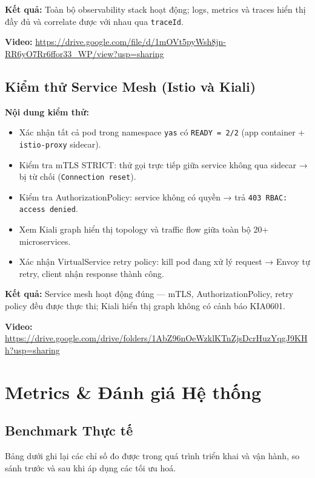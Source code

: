 \textbf{Kết quả:} Toàn bộ observability stack hoạt động; logs, metrics và traces hiển thị đầy đủ và correlate được với nhau qua \texttt{traceId}.

\noindent\textbf{Video:} \url{https://drive.google.com/file/d/1mOVt5pyWsh8jn-RR6yO7Rr6ffor33_WP/view?usp=sharing}

\subsection{Kiểm thử Service Mesh (Istio và Kiali)}

\textbf{Nội dung kiểm thử:}
\begin{itemize}
    \item Xác nhận tất cả pod trong namespace \texttt{yas} có \texttt{READY = 2/2} (app container + \texttt{istio-proxy} sidecar).
    \item Kiểm tra mTLS STRICT: thử gọi trực tiếp giữa service không qua sidecar → bị từ chối (\texttt{Connection reset}).
    \item Kiểm tra AuthorizationPolicy: service không có quyền → trả \texttt{403 RBAC: access denied}.
    \item Xem Kiali graph hiển thị topology và traffic flow giữa toàn bộ 20+ microservices.
    \item Xác nhận VirtualService retry policy: kill pod đang xử lý request → Envoy tự retry, client nhận response thành công.
\end{itemize}

\textbf{Kết quả:} Service mesh hoạt động đúng — mTLS, AuthorizationPolicy, retry policy đều được thực thi; Kiali hiển thị graph không có cảnh báo KIA0601.

\noindent\textbf{Video:} \url{https://drive.google.com/drive/folders/1AbZ96nOeWzklKTnZjsDcrHuzYqgJ9KHh?usp=sharing}







\section{Metrics \& Đánh giá Hệ thống}

\subsection{Benchmark Thực tế}

Bảng dưới ghi lại các chỉ số đo được trong quá trình triển khai và vận hành, so sánh trước và sau khi áp dụng các tối ưu hoá.


